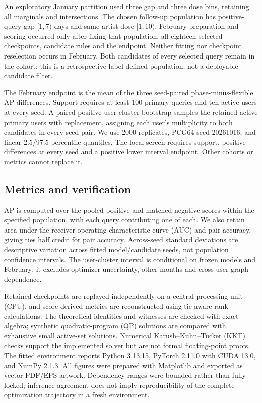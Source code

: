 \documentclass[pdflatex,sn-vancouver-num]{sn-jnl}
\theoremstyle{thmstyleone}
\begin{document}
An exploratory January partition used three gap and three dose bins, retaining all marginals and intersections. The chosen follow-up population has positive-query gap $[1,7)$ days and same-artist dose $[1,10)$. February preparation and scoring occurred only after fixing that population, all eighteen selected checkpoints, candidate rules and the endpoint. Neither fitting nor checkpoint reselection occurs in February. Both candidates of every selected query remain in the cohort; this is a retrospective label-defined population, not a deployable candidate filter.

The February endpoint is the mean of the three seed-paired phase-minus-flexible AP differences. Support requires at least 100 primary queries and ten active users at every seed. A paired positive-user-cluster bootstrap samples the retained active primary users with replacement, assigning each user's multiplicity to both candidates in every seed pair. We use 2000 replicates, PCG64 seed 20261016, and linear 2.5/97.5 percentile quantiles. The local screen requires support, positive differences at every seed and a positive lower interval endpoint. Other cohorts or metrics cannot replace it.

\subsection{Metrics and verification}
AP is computed over the pooled positive and matched-negative scores within the specified population, with each query contributing one of each. We also retain area under the receiver operating characteristic curve (AUC) and pair accuracy, giving ties half credit for pair accuracy. Across-seed standard deviations are descriptive variation across fitted model/candidate seeds, not population confidence intervals. The user-cluster interval is conditional on frozen models and February; it excludes optimizer uncertainty, other months and cross-user graph dependence.

Retained checkpoints are replayed independently on a central processing unit (CPU), and score-derived metrics are reconstructed using tie-aware rank calculations. The theoretical identities and witnesses are checked with exact algebra; synthetic quadratic-program (QP) solutions are compared with exhaustive small active-set solutions. Numerical Karush--Kuhn--Tucker (KKT) checks support the implemented solver but are not formal floating-point proofs. The fitted environment reports Python 3.13.15, PyTorch 2.11.0 with CUDA 13.0, and NumPy 2.1.3. All figures were prepared with Matplotlib and exported as vector PDF/EPS artwork. Dependency ranges were bounded rather than fully locked; inference agreement does not imply reproducibility of the complete optimization trajectory in a fresh environment.
\end{document}
